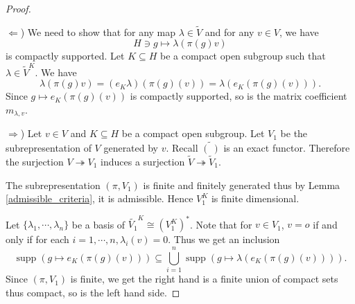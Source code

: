 \documentclass[8pt]{article}
\DeclareMathOperator{\supp}{supp}
\begin{document}
\begin{proof}$\:$
  \par $\Leftarrow$) We need to show that for any map $\lambda\in \widetilde{V}$ and for any $v\in V$, we have
  \begin{equation*}
    H\ni g\mapsto \lambda(\pi(g)v)
  \end{equation*}
  is compactly supported. Let $K\subseteq H$ be a compact open subgroup such that $\lambda\in\widetilde{V}^K$.
  We have
  \begin{equation*}
    \lambda(\pi(g)v) = (e_K\lambda)(\pi(g)(v)) = \lambda(e_K(\pi(g)(v))).
  \end{equation*}
  Since $g\mapsto e_K(\pi(g)(v))$ is compactly supported, so is the matrix coefficient $m_{\lambda,v}$. %
  \par $\Rightarrow$) Let $v\in V$ and $K\subseteq H$ be a compact open subgroup. Let $V_1$ be the subrepresentation of $V$ generated by $v$. Recall $\widetilde{(\:)}$ is an exact functor.
  Therefore the surjection $V\twoheadrightarrow V_1$ induces a surjection $\widetilde{V}\twoheadrightarrow \widetilde{V}_1$.
  \par The subrepresentation $(\pi,V_1)$ is finite and finitely generated thus by Lemma \ref{admissible_criteria}, it is admissible.
  Hence $V_1^K$ is finite dimensional.
  \par Let $\{\lambda_1,\cdots,\lambda_n\}$ be a basis of $\widetilde{V_1}^K \cong (V_1^K)^*$. Note that for $v\in V_1$, $v=o$ if and only if for each $i=1,\cdots,n,\lambda_i(v)=0$.
  Thus we get an inclusion
  \begin{equation*}
    \supp(g\mapsto e_K(\pi(g)(v)))\subseteq\bigcup_{i=1}^n\supp(g\mapsto \lambda(e_K(\pi(g)(v)))).
  \end{equation*}
  Since $(\pi,V_1)$ is finite, we get the right hand is a finite union of compact sets thus compact, so is the left hand side.
\end{proof}
\end{document}
